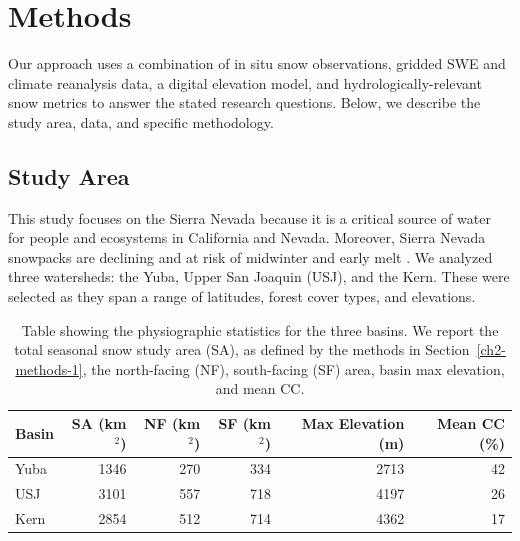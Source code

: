 \hypertarget{ch2-sa}{\section{Methods}\label{ch2-sa}}

Our approach uses a combination of in situ snow observations, gridded SWE and climate reanalysis data, a digital elevation model, and hydrologically-relevant snow metrics to answer the stated research questions. Below, we describe the study area, data, and specific methodology.

\hypertarget{ch2-sa}{\subsection{Study Area}\label{ch2-sa}}

This study focuses on the Sierra Nevada because it is a critical source of water for people and ecosystems in California and Nevada. Moreover, Sierra Nevada snowpacks are declining and at risk of midwinter and early melt \citep{harpoldDefiningSnowDrought2017}. We analyzed three watersheds: the Yuba, Upper San Joaquin (USJ), and the Kern. These were selected as they span a range of latitudes, forest cover types, and elevations.

\begin{table}[htbp]
  \centering
  \caption{Table showing the physiographic statistics for the three basins. We report the total seasonal snow study area (SA), as defined by the methods in Section~\ref{ch2-methods-1}, the north-facing (NF), south-facing (SF) area, basin max elevation, and mean CC.}
  \label{tab:snow_metrics_val_table}
  \begin{tabular}{lrrrrr}
    \toprule
    Basin & SA (km$^{2}$) & NF (km$^{2}$) & SF (km$^{2}$) & Max Elevation (m) & Mean CC (\%) \\
    \midrule
    Yuba  & 1346 & 270 & 334 & 2713 & 42 \\
    USJ   & 3101 & 557 & 718 & 4197 & 26 \\
    Kern  & 2854 & 512 & 714 & 4362 & 17 \\
    \bottomrule
  \end{tabular}
\end{table}

